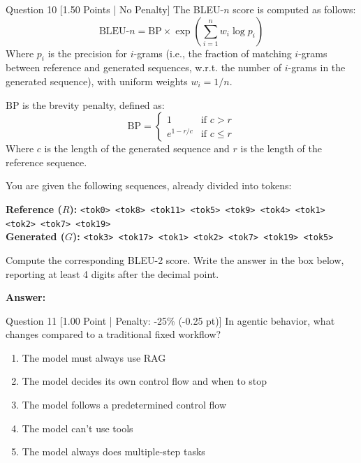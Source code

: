 \documentclass[11pt,a4paper]{article}
\begin{document}
\begin{questionbox}{Question 10 \hfill [1.50 Points | No Penalty]}
The BLEU-$n$ score is computed as follows:
\begin{equation*}
\text{BLEU-}n = \text{BP} \times \exp\left( \sum_{i=1}^n w_i \log p_i \right)
\end{equation*}
Where $p_i$ is the precision for $i$-grams (i.e., the fraction of matching $i$-grams between reference and generated sequences, w.r.t. the number of $i$-grams in the generated sequence), with uniform weights $w_i = 1/n$.

\noindent $\text{BP}$ is the brevity penalty, defined as:
\begin{equation*}
\text{BP} = \begin{cases}
1 & \text{if } c > r \\
e^{1 - r/c} & \text{if } c \le r
\end{cases}
\end{equation*}
Where $c$ is the length of the generated sequence and $r$ is the length of the reference sequence.

\noindent You are given the following sequences, already divided into tokens:
\begin{center}
\begin{tcolorbox}[enhanced,colback=codebg,colframe=gray!30,arc=1.5mm,boxrule=0.6pt,width=0.96\linewidth]
\small
\textbf{Reference ($R$):} \texttt{<tok0> <tok8> <tok11> <tok5> <tok9> <tok4> <tok1> <tok2> <tok7> <tok19>}\\[3pt]
\textbf{Generated ($G$):} \texttt{<tok3> <tok17> <tok1> <tok2> <tok7> <tok19> <tok5>}
\end{tcolorbox}
\end{center}

\noindent Compute the corresponding BLEU-2 score. Write the answer in the box below, reporting at least 4 digits after the decimal point.

\vspace{0.2cm}
\noindent\textbf{Answer:} \underline{\hspace{4cm}}
\end{questionbox}

\vspace{0.3cm}

\begin{questionbox}{Question 11 \hfill [1.00 Point | Penalty: -25\% (-0.25 pt)]}
In agentic behavior, what changes compared to a traditional fixed workflow?

\begin{enumerate}[label=\alph*.,itemsep=2pt]
    \item The model must always use RAG
    \item The model decides its own control flow and when to stop
    \item The model follows a predetermined control flow
    \item The model can't use tools
    \item The model always does multiple-step tasks
\end{enumerate}
\end{questionbox}
\end{document}
